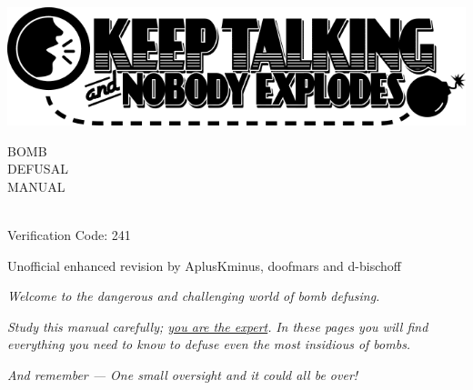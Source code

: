 \documentclass{../../ktane-mod}
\begin{document}
\thispagestyle{fancy}
\fancyhead{}
\vspace*{2cm}

\begin{center}
  \includegraphics[width=\textwidth]{../../../../resources/logo}

  \vspace{1cm}

  
  \fontsize{140pt}{120pt}\selectfont BOMB \\[-5pt]
  \fontsize{80pt}{70pt}\selectfont DEFUSAL \\[-5pt] 
  \fontsize{93pt}{80pt}\selectfont MANUAL

  \vspace{2cm}

  \fontsize{30pt}{30pt}\selectfont {\bfseries Version 1} \\[10pt]
  \fontsize{18pt}{18pt}\selectfont Verification Code: 241
\end{center}

\vfill

\begin{center}
  \normalsize Unofficial enhanced revision by AplusKminus, doofmars and d-bischoff
\end{center}

\clearpage
\vspace*{\fill}
\begin{minipage}[c]{0.9\textwidth}
  \begin{center}
    \setlength{\parskip}{10pt}
    \textit{Welcome to the dangerous and challenging world of bomb defusing.}

    \textit{Study this manual carefully; \uline{you are the expert}.}
    \textit{In these pages you will find everything you need to know to defuse even the most insidious of bombs.}

    \textit{And remember --- One small oversight and it could all be over!}
  \end{center}
\end{minipage}
\vfill %
\clearpage
\end{document}
